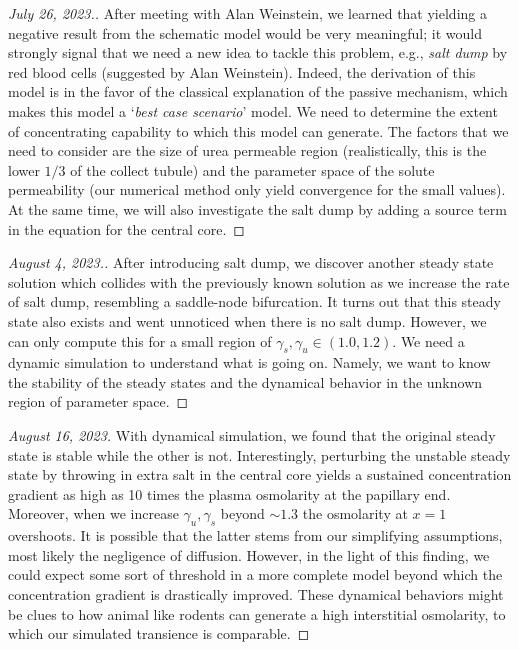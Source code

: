 \documentclass{article}
\numberwithin{equation}{section} %
\begin{document}
\begin{proof}[July 26, 2023.]
    After meeting with Alan Weinstein, we learned that yielding a negative result from the schematic model would be very meaningful; it would strongly signal that we need a new idea to tackle this problem, e.g., \textit{salt dump} by red blood cells (suggested by Alan Weinstein).
    Indeed, the derivation of this model is in the favor of the classical explanation of the passive mechanism, which makes this model a `\textit{best case scenario}' model.
    We need to determine the extent of concentrating capability to which this model can generate.
    The factors that we need to consider are the size of urea permeable region (realistically, this is the lower $1/3$ of the collect tubule) and the parameter space of the solute permeability (our numerical method only yield convergence for the small values).
    At the same time, we will also investigate the salt dump by adding a source term in the equation for the central core.
\end{proof}

\begin{proof}[August 4, 2023.]
    After introducing salt dump, we discover another steady state solution which collides with the previously known solution as we increase the rate of salt dump, resembling a saddle-node bifurcation.
    It turns out that this steady state also exists and went unnoticed when there is no salt dump.
    However, we can only compute this for a small region of $\gamma_s,\gamma_u\in (1.0,1.2)$.
    We need a dynamic simulation to understand what is going on.
    Namely, we want to know the stability of the steady states and the dynamical behavior in the unknown region of parameter space.
\end{proof}

\begin{proof}[August 16, 2023]
    With dynamical simulation, we found that the original steady state is stable while the other is not.
    Interestingly, perturbing the unstable steady state by throwing in extra salt in the central core yields a sustained concentration gradient as high as 10 times the plasma osmolarity at the papillary end.
    Moreover, when we increase $\gamma_u,\gamma_s$ beyond $\sim 1.3$ the osmolarity at $x=1$ overshoots.
    It is possible that the latter stems from our simplifying assumptions, most likely the negligence of diffusion.
    However, in the light of this finding, we could expect some sort of threshold in a more complete model beyond which the concentration gradient is drastically improved.
    These dynamical behaviors might be clues to how animal like rodents can generate a high interstitial osmolarity, to which our simulated transience is comparable.
\end{proof}
\end{document}
